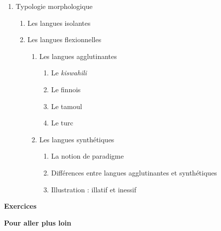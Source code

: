 \begin{keybox}
\begin{enumerate}[label=\arabic*.]
\begin{enumerate}[label=\textcircled{\scriptsize\arabic*}]
\item Auguste Schlegel : la tripartition des langues
\item Wilhelm von Humboldt
\begin{enumerate}[label=\arabic*.]
\item L’hypothèse humboldtienne
\item Le chinois, « une langue sans grammaire » ?
\begin{enumerate}[label=\arabic*)]
\item La réponse d’Abel Rémusat
\item Le « génie de la langue chinoise »
\end{enumerate}
\end{enumerate}
\item Joseph Harold Greenberg
\begin{enumerate}[label=\arabic*.]
\item Les invariants linguistiques
\item Typologie syntaxique
\begin{enumerate}[label=\arabic*)]
\item Les langues SOV, SVO et VSO
\item Les langues VOS, OVS et OSV
\end{enumerate}
\end{enumerate}
\end{enumerate}
\item Typologie morphologique
\begin{enumerate}[label=\textcircled{\scriptsize\arabic*}]
\item Les langues isolantes
\item Les langues flexionnelles
\begin{enumerate}[label=\arabic*.]
\item Les langues agglutinantes
\begin{enumerate}[label=\arabic*)]
\item Le \textit{kiswahili}
\item Le finnois
\item Le tamoul
\item Le turc
\end{enumerate}
\item Les langues synthétiques
\begin{enumerate}[label=\arabic*)]
\item La notion de paradigme
\item Différences entre langues agglutinantes et synthétiques
\item Illustration : illatif et inessif
\end{enumerate}
\end{enumerate}
\end{enumerate}
\end{enumerate}
\textbf{Exercices}\par
\textbf{Pour aller plus loin}
\end{keybox}


